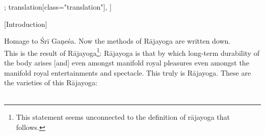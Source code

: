 \begin{alignment}[
    texts=edition[class="edition"];
    translation[class="translation"],
  ]
\begin{edition}
\begin{tlg}
\end{tlg}
\vfill
\ekdpb*{}
\end{edition}
\begin{translation}
\centerline{\textrm{\small{[Introduction]}}}
\bigskip
\begin{tlate}
Homage to Śrī Gaṇeśa. Now the methods of Rājayoga are written down. \\
\noindent This is the result of Rājayoga\footnote{This statement seems unconnected to the definition of rājayoga that follows.}: Rājayoga is that by which long-term durability of the body arises [and] even amongst manifold royal pleasures even amongst the manifold royal entertainments and spectacle. This truly is Rājayoga. These are the varieties of this Rājayoga:\\\\

\end{tlate}
\end{translation}
\end{alignment}
